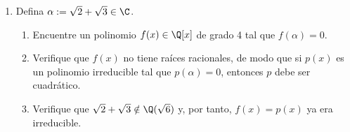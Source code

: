 \documentclass[11pt, reqno]{amsart}
\begin{document}
\begin{enumerate}




	\item Defina $\alpha := \sqrt{2} + \sqrt{3} \in \C$.
		\begin{enumerate}
			\item Encuentre un polinomio $f(x) \in \Q[x]$ de grado 4 tal que $f(\alpha) = 0$.
			\item Verifique que $f(x)$ no tiene raíces racionales, de modo que si $p(x)$ es un polinomio irreducible tal que $p(\alpha) = 0$,
				entonces $p$ debe ser cuadrático.
			\item Verifique que $\sqrt{2} + \sqrt{3} \notin \Q(\sqrt{6})$ y, por tanto, $f(x) = p(x)$ ya era irreducible.
		\end{enumerate}
\end{enumerate}
\end{document}
